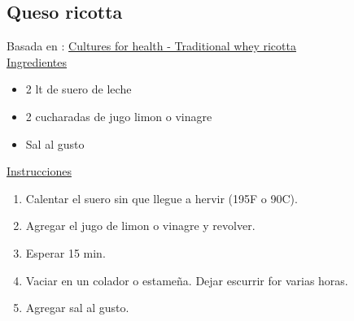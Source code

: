 \subsection{Queso ricotta}\label{queso-ricotta}

Basada en : \href{https://www.culturesforhealth.com/learn/recipe/cheese-recipes/whey-traditional-ricotta-cheese/}{Cultures for health - Traditional whey ricotta} \\

\underline{Ingredientes}
\begin{itemize}
\item 2 lt de suero de leche
\item 2 cucharadas de jugo limon o vinagre
\item Sal al gusto
\end{itemize}


\underline{Instrucciones}
\begin{enumerate}
\item Calentar el suero sin que llegue a hervir (\Sim 195F o 90C).
\item Agregar el jugo de limon o vinagre y revolver.
\item Esperar 15 min.
\item Vaciar en un colador o estame\~na. Dejar escurrir for varias horas.
\item Agregar sal al gusto.
\end{enumerate}
